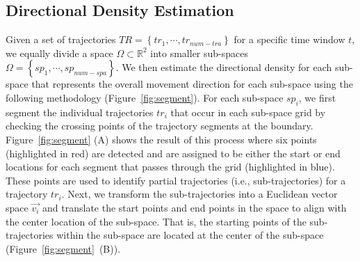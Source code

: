 \subsection{Directional Density Estimation}
\label{sec:discretization}




Given a set of trajectories 
$TR = \left\{ tr_1, \cdots, tr_{num-tra}\right\}$ 
for a specific time window $t$,
we equally divide a space 
$\Omega\subset \mathbb{R}^{2}$ 
into smaller sub-spaces
$\Omega = \left\{sp_1, \cdots, sp_{num-spa}\right\}$.
We then estimate the directional density for each sub-space that represents the overall movement direction for each sub-space using the following methodology (Figure~\ref{fig:segment}).
For each sub-space $sp_i$, we first segment the individual trajectories $tr_i$ that occur in each sub-space grid by checking the crossing points of the trajectory segments at the boundary.
Figure~\ref{fig:segment} (A) shows the result of this process where six points (highlighted in red) are detected and are assigned to be either the start or end locations for each segment that passes through the grid (highlighted in blue). 
These points are used to identify partial trajectories (i.e., sub-trajectories) for a trajectory $tr_i$.
Next, we transform the sub-trajectories into a Euclidean vector space $\vec{v_i}$ and translate the start points and end points in the space to align with the center location of the sub-space. That is, the starting points of the sub-trajectories within the sub-space are located at the center of the sub-space (Figure~\ref{fig:segment}~(B)).

